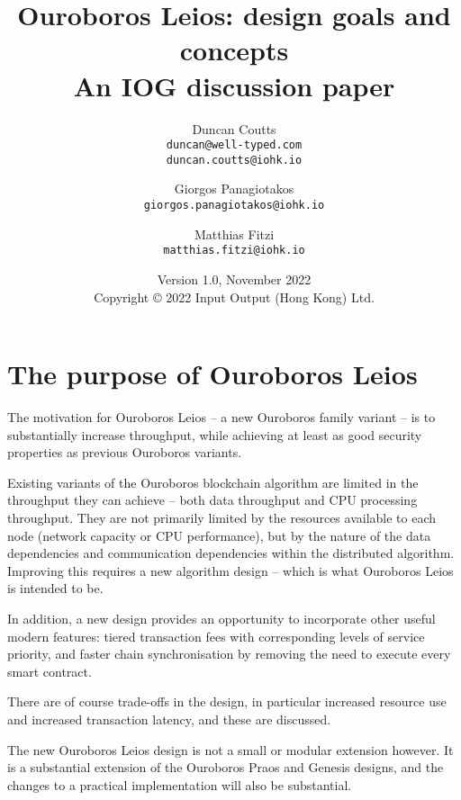 \documentclass[11pt,a4paper]{article}
\begin{document}
\title{Ouroboros Leios: design goals and concepts\\
       {\large \sc An IOG discussion paper}}
\date{Version 1.0, November 2022 \\ \small Copyright \copyright{} 2022 Input Output (Hong Kong) Ltd.}
\author{Duncan Coutts        \\ {\small \texttt{duncan@well-typed.com}} \\
                                {\small \texttt{duncan.coutts@iohk.io}} 
  \and  Giorgos Panagiotakos \\ {\small \texttt{giorgos.panagiotakos@iohk.io}}
  \and  Matthias Fitzi       \\ {\small \texttt{matthias.fitzi@iohk.io}}
}

\maketitle

\section*{The purpose of Ouroboros Leios}

The motivation for Ouroboros Leios -- a new Ouroboros family variant -- is to
substantially increase throughput, while achieving at least as good security
properties as previous Ouroboros variants.

Existing variants of the Ouroboros blockchain algorithm are limited in the
throughput they can achieve -- both data throughput and CPU processing
throughput. They are not primarily limited by the resources available to each
node (network capacity or CPU performance), but by the nature of the data
dependencies and communication dependencies within the distributed algorithm.
Improving this requires a new algorithm design -- which is what Ouroboros Leios
is intended to be.

In addition, a new design provides an opportunity to incorporate other useful
modern features: tiered transaction fees with corresponding levels of service
priority, and faster chain synchronisation by removing the need to execute every
smart contract.

There are of course trade-offs in the design, in particular increased resource
use and increased transaction latency, and these are discussed.

The new Ouroboros Leios design is not a small or modular extension however. It
is a substantial extension of the Ouroboros Praos and Genesis designs, and the
changes to a practical implementation will also be substantial.
\end{document}
